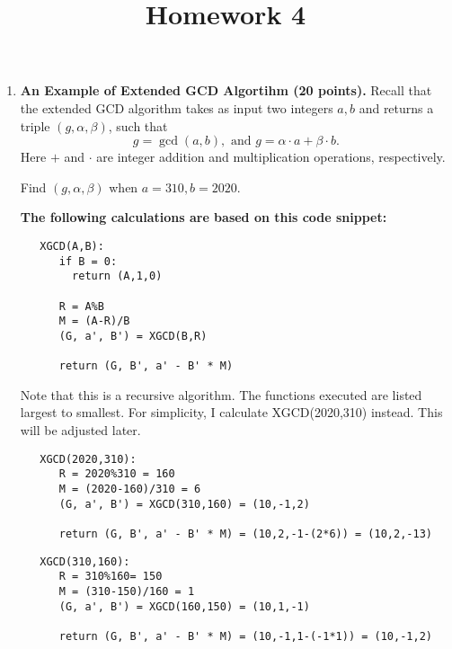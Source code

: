 \documentclass[11pt]{article}
\begin{document}
\title{Homework 4}

\date{}

\maketitle 

\thispagestyle{fancy}  
\pagestyle{fancy}      




\begin{enumerate}
\item {\bfseries An Example of Extended GCD Algortihm (20 points).}
    Recall that the extended GCD algorithm takes as input two integers $a, b$ and returns a triple $(g, \alpha, \beta)$, such that 
    $$g = \gcd(a,b), \text{ and } g = \alpha \cdot a + \beta \cdot b.$$ 
    Here $+$ and $\cdot$ are integer addition and multiplication operations, respectively. 
    
    Find $(g, \alpha, \beta)$ when $a = 310, b = 2020$. 
    
  {\bfseries 
    The following calculations are based on this code snippet:
   \begin{verbatim}
   XGCD(A,B):
      if B = 0:
        return (A,1,0)

      R = A%B
      M = (A-R)/B
      (G, a', B') = XGCD(B,R)

      return (G, B', a' - B' * M)
   \end{verbatim}
  
    Note that this is a recursive algorithm. The functions executed are listed largest to smallest. For simplicity, I calculate XGCD(2020,310) instead. This will be adjusted later.
   \begin{verbatim}
   XGCD(2020,310):
      R = 2020%310 = 160
      M = (2020-160)/310 = 6
      (G, a', B') = XGCD(310,160) = (10,-1,2)

      return (G, B', a' - B' * M) = (10,2,-1-(2*6)) = (10,2,-13)
   \end{verbatim}

   \begin{verbatim}
   XGCD(310,160):
      R = 310%160= 150
      M = (310-150)/160 = 1
      (G, a', B') = XGCD(160,150) = (10,1,-1)

      return (G, B', a' - B' * M) = (10,-1,1-(-1*1)) = (10,-1,2)
   \end{verbatim}

}
\end{enumerate}
\end{document}
